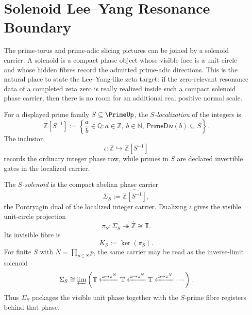 \section{Solenoid Lee--Yang Resonance Boundary}
\label{sec:unified-reality-solenoid-lee-yang-resonance-boundary}

The prime-torus and prime-adic slicing pictures can be joined by a
solenoid carrier.  A solenoid is a compact phase object whose visible
face is a unit circle and whose hidden fibres record the admitted
prime-adic directions.  This is the natural place to state the
Lee--Yang-like zeta target: if the zero-relevant resonance data of a
completed zeta zero is really realized inside such a compact solenoid
phase carrier, then there is no room for an additional real positive
normal scale.

\begin{definition}[$S$-localization]
\label{def:unified-reality-s-localization}
For a displayed prime family $S\subseteq\PrimeUp$, the
\emph{$S$-localization} of the integers is
$$
\mathbb Z[S^{-1}]
:=
\left\{
\frac{a}{b}\in\mathbb Q:
a\in\mathbb Z,\ b\in\mathbb N,\ \mathsf{PrimeDiv}(b)\subseteq S
\right\}.
$$
The inclusion
$$
\iota:\mathbb Z\hookrightarrow\mathbb Z[S^{-1}]
$$
records the ordinary integer phase row, while primes in $S$ are declared
invertible gates in the localized carrier.
\end{definition}

\begin{definition}
\label{def:unified-reality-s-solenoid-over-unit-circle}
The \emph{$S$-solenoid} is the compact abelian phase carrier
$$
\Sigma_S:=\widehat{\mathbb Z[S^{-1}]},
$$
the Pontryagin dual of the localized integer carrier.  Dualizing
$\iota$ gives the visible unit-circle projection
$$
\pi_S:\Sigma_S\twoheadrightarrow\widehat{\mathbb Z}\cong\mathbb T.
$$
Its invisible fibre is
$$
K_S:=\ker(\pi_S).
$$
For finite $S$ with $N=\prod_{p\in S}p$, the same carrier may be read as
the inverse-limit solenoid
$$
\Sigma_S
\cong
\varprojlim
\left(
\mathbb T
\xleftarrow{z\mapsto z^N}
\mathbb T
\xleftarrow{z\mapsto z^N}
\mathbb T
\xleftarrow{z\mapsto z^N}
\cdots
\right).
$$
Thus $\Sigma_S$ packages the visible unit phase together with the
$S$-prime fibre registers behind that phase.
\end{definition}

